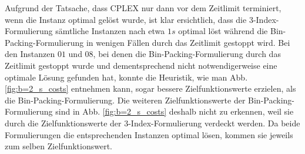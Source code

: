 Aufgrund der Tatsache, dass CPLEX nur dann vor dem Zeitlimit terminiert, wenn die Instanz optimal gelöst wurde, ist klar
ersichtlich, dass die 3-Index-Formulierung sämtliche Instanzen nach etwa $1s$ optimal löst während die Bin-Packing-Formulierung in wenigen Fällen durch das Zeitlimit gestoppt wird.\newline
Bei den Instanzen $01$ und $08$, bei denen die Bin-Packing-Formulierung durch das Zeitlimit gestoppt wurde und dementsprechend nicht
notwendigerweise eine optimale Lösung gefunden hat, konnte die Heuristik, wie man Abb. \ref{fig:b=2_s_costs} entnehmen kann, sogar
bessere Zielfunktionswerte erzielen, als die Bin-Packing-Formulierung.\newline
Die weiteren Zielfunktionswerte der Bin-Packing-Formulierung sind in Abb. \ref{fig:b=2_s_costs}  deshalb nicht zu erkennen,
weil sie durch die Zielfunktionswerte der 3-Index-Formulierung verdeckt werden. Da beide Formulierungen die entsprechenden
Instanzen optimal lösen, kommen sie jeweils zum selben Zielfunktionswert.

